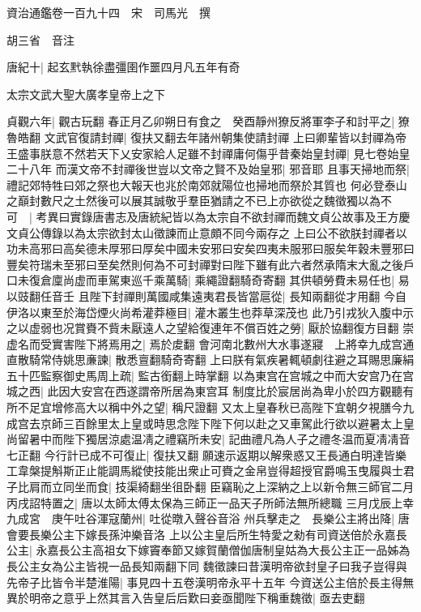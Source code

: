 資治通鑑卷一百九十四　宋　司馬光　撰

胡三省　音注

唐紀十|{
	起玄黓執徐盡彊圉作噩四月凡五年有奇}


太宗文武大聖大廣孝皇帝上之下

貞觀六年|{
	觀古玩翻}
春正月乙卯朔日有食之　癸酉靜州獠反將軍李子和討平之|{
	獠魯皓翻}
文武官復請封禪|{
	復扶又翻去年諸州朝集使請封禪}
上曰卿輩皆以封禪為帝王盛事朕意不然若天下乂安家給人足雖不封禪庸何傷乎昔秦始皇封禪|{
	見七卷始皇二十八年}
而漢文帝不封禪後世豈以文帝之賢不及始皇邪|{
	邪音耶}
且事天掃地而祭|{
	禮記郊特牲曰郊之祭也大報天也兆於南郊就陽位也掃地而祭於其質也}
何必登泰山之巔封數尺之土然後可以展其誠敬乎羣臣猶請之不已上亦欲從之魏徵獨以為不可　|{
	考異曰實錄唐書志及唐統紀皆以為太宗自不欲封禪而魏文貞公故事及王方慶文貞公傳錄以為太宗欲封太山徵諫而止意頗不同今兩存之}
上曰公不欲朕封禪者以功未高邪曰高矣德未厚邪曰厚矣中國未安邪曰安矣四夷未服邪曰服矣年穀未豐邪曰豐矣符瑞未至邪曰至矣然則何為不可封禪對曰陛下雖有此六者然承隋末大亂之後戶口未復倉廩尚虚而車駕東巡千乘萬騎|{
	乘繩證翻騎奇寄翻}
其供頓勞費未易任也|{
	易以豉翻任音壬}
且陛下封禪則萬國咸集遠夷君長皆當扈從|{
	長知兩翻從才用翻}
今自伊洛以東至於海岱煙火尚希灌莽極目|{
	灌木叢生也莽草深茂也}
此乃引戎狄入腹中示之以虚弱也况賞賚不貲未厭遠人之望給復連年不償百姓之勞|{
	厭於協翻復方目翻}
崇虚名而受實害陛下將焉用之|{
	焉於䖍翻}
會河南北數州大水事遂寢　上將幸九成宫通直散騎常侍姚思亷諫|{
	散悉亶翻騎奇寄翻}
上曰朕有氣疾暑輒頓劇往避之耳賜思廉絹五十匹監察御史馬周上疏|{
	監古銜翻上時掌翻}
以為東宫在宫城之中而大安宫乃在宫城之西|{
	此因大安宫在西遂謂帝所居為東宫耳}
制度比於宸居尚為卑小於四方觀聽有所不足宜增修高大以稱中外之望|{
	稱尺證翻}
又太上皇春秋已高陛下宜朝夕視膳今九成宫去京師三百餘里太上皇或時思念陛下陛下何以赴之又車駕此行欲以避暑太上皇尚留暑中而陛下獨居涼處温凊之禮竊所未安|{
	記曲禮凡為人子之禮冬温而夏凊凊音七正翻}
今行計已成不可復止|{
	復扶又翻}
願速示返期以解衆惑又王長通白明達皆樂工韋槃提斛斯正止能調馬縱使技能出衆止可賚之金帛豈得超授官爵鳴玉曳履與士君子比肩而立同坐而食|{
	技渠綺翻坐徂卧翻}
臣竊恥之上深納之上以新令無三師官二月丙戌詔特置之|{
	唐以太師太傅太保為三師正一品天子所師法無所總職}
三月戊辰上幸九成宮　庚午吐谷渾寇蘭州|{
	吐從暾入聲谷音浴}
州兵擊走之　長樂公主將出降|{
	唐會要長樂公主下嫁長孫沖樂音洛}
上以公主皇后所生特愛之勑有司資送倍於永嘉長公主|{
	永嘉長公主高祖女下嫁竇奉節又嫁賀蘭僧伽唐制皇姑為大長公主正一品姊為長公主女為公主皆視一品長知兩翻下同}
魏徵諫曰昔漢明帝欲封皇子曰我子豈得與先帝子比皆令半楚淮陽|{
	事見四十五卷漢明帝永平十五年}
今資送公主倍於長主得無異於明帝之意乎上然其言入告皇后后歎曰妾亟聞陛下稱重魏徵|{
	亟去吏翻}
